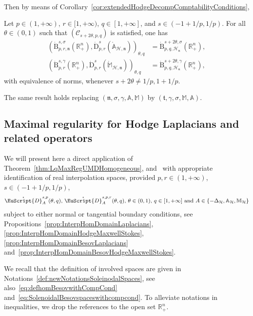 \documentclass[10pt]{amsart}
\theoremstyle{definition}\newtheorem{defi}[theo]{Definition}\newtheorem{rema}[theo]{Remark}\newtheorem{exam}[theo]{Example}\newtheorem{exem}[theo]{Example}\newtheorem{nota}[theo]{Notation}
\newcommand{\bbA}{\mathbb{A}}
\newcommand{\bbR}{\mathbb{R}}
\newcommand{\bbM}{\mathbb{M}}
\newcommand{\rmB}{\mathrm{B}}
\newcommand{\rmD}{\mathrm{D}}
\newcommand{\clH}{\mathcal{H}}
\newcommand{\clC}{\mathcal{C}}
\newcommand{\fkn}{\mathfrak{n}}
\newcommand{\fkt}{\mathfrak{t}}
\newcommand{\rgeusD}{\mathring{\eus{D}}}
\newcommand{\eus}{\EuScript}
\begin{document}
Then by means of Corollary~\ref{cor:extendedHodgeDecompComptabilityConditions},

\begin{prop}\label{prop:InterpHomDomainBesovHodgeMaxwellStokes}
Let $p\in(1,+\infty)$, $r\in[1,+\infty)$, $q\in[1,+\infty]$, and $s\in(-1+1/p,1/p)$. For all $\theta\in(0,1)$ such that $(\clC_{s+2\theta,p,q})$ is satisfied, one has
\begin{align*}
\left(\dot{\rmB}^{s,\sigma}_{p,r,\fkn}\left(\bbR^n_+\right),\dot{\rmD}^{s}_{p,r}
\left(\mathring{\bbA}_{\clH,\fkn}\right)\right)_{\theta,q} &= \dot{\rmB}^{s+2\theta,\sigma}_{p,q,\clH_{\fkn}}\left(\bbR^n_+\right),\\
\left(\dot{\rmB}^{s,\gamma}_{p,r}\left(\bbR^n_+\right),\dot{\rmD}^{s}_{p,r}\left(\mathring{\bbM}_{\clH,\fkn}\right)\right)_{\theta,q} &= \dot{\rmB}^{s+2\theta,\gamma}_{p,q,\clH_{\fkn}}\left(\bbR^n_+\right),
\end{align*}
with equivalence of norms, whenever $s+2\theta\neq 1/p,1+1/p$.

The same result holds replacing $(\fkn,\sigma,\gamma,\bbA,\bbM)$ by $(\fkt,\gamma,\sigma,\bbM,\bbA)$.
\end{prop}



\subsection{Maximal regularity for Hodge Laplacians and related operators}\label{sec:maxRegMaxHodgeStokes}


We will present here a direct application of Theorem~\ref{thm:LqMaxRegUMDHomogeneous}, and~\cite[Theorem~2.20]{DanchinHieberMuchaTolk2020} with appropriate identification of real interpolation spaces, provided $p,r\in(1,+\infty)$, $s\in(-1+1/p,1/p)$,
\begin{align*}
\rgeusD^{s,p}_{A}(\theta,q) \text{, }\rgeusD^{s,p,r}_{A}(\theta,q) \text{, } \theta\in(0,1) \text{, } q\in[1,+\infty] \text{ and } A\in\left\{-\Delta_{\clH},\bbA_\clH,\bbM_\clH\right\}
\end{align*}
subject to either normal or tangential boundary conditions, see Propositions~\ref{prop:InterpHomDomainLaplacians}, \ref{prop:InterpHomDomainHodgeMaxwellStokes}, \ref{prop:InterpHomDomainBesovLaplacians} and~\ref{prop:InterpHomDomainBesovHodgeMaxwellStokes}.

We recall that the definition of involved spaces are given in Notations~\ref{def:newNotationsSoleinodalSpaces}, see also~\eqref{eq:defhomBesovwithCompCond} and~\eqref{eq:SolenoidalBesovspaceswithcompcond}. To alleviate notations in inequalities, we drop the references to the open set $\bbR^n_+$.
\end{document}

